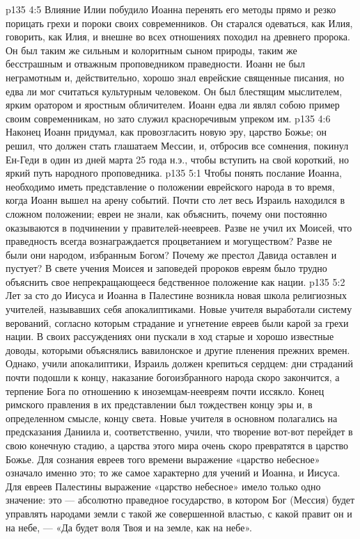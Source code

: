 \vs p135 4:5 Влияние Илии побудило Иоанна перенять его методы прямо и резко порицать грехи и пороки своих современников. Он старался одеваться, как Илия, говорить, как Илия, и внешне во всех отношениях походил на древнего пророка. Он был таким же сильным и колоритным сыном природы, таким же бесстрашным и отважным проповедником праведности. Иоанн не был неграмотным и, действительно, хорошо знал еврейские священные писания, но едва ли мог считаться культурным человеком. Он был блестящим мыслителем, ярким оратором и яростным обличителем. Иоанн едва ли являл собою пример своим современникам, но зато служил красноречивым упреком им.
\vs p135 4:6 Наконец Иоанн придумал, как провозгласить новую эру, царство Божье; он решил, что должен стать глашатаем Мессии, и, отбросив все сомнения, покинул Ен\hyp{}Геди в один из дней марта 25 года н.э., чтобы вступить на свой короткий, но яркий путь народного проповедника.
\vs p135 5:1 Чтобы понять послание Иоанна, необходимо иметь представление о положении еврейского народа в то время, когда Иоанн вышел на арену событий. Почти сто лет весь Израиль находился в сложном положении; евреи не знали, как объяснить, почему они постоянно оказываются в подчинении у правителей\hyp{}неевреев. Разве не учил их Моисей, что праведность всегда вознаграждается процветанием и могуществом? Разве не были они народом, избранным Богом? Почему же престол Давида оставлен и пустует? В свете учения Моисея и заповедей пророков евреям было трудно объяснить свое непрекращающееся бедственное положение как нации.
\vs p135 5:2 Лет за сто до Иисуса и Иоанна в Палестине возникла новая школа религиозных учителей, называвших себя апокалиптиками. Новые учителя выработали систему верований, согласно которым страдание и угнетение евреев были карой за грехи нации. В своих рассуждениях они пускали в ход старые и хорошо известные доводы, которыми объяснялись вавилонское и другие пленения прежних времен. Однако, учили апокалиптики, Израиль должен крепиться сердцем: дни страданий почти подошли к концу, наказание богоизбранного народа скоро закончится, а терпение Бога по отношению к иноземцам\hyp{}неевреям почти иссякло. Конец римского правления в их представлении был тождествен концу эры и, в определенном смысле, концу света. Новые учителя в основном полагались на предсказания Даниила и, соответственно, учили, что творение вот\hyp{}вот перейдет в свою конечную стадию, а царства этого мира очень скоро превратятся в царство Божье. Для сознания евреев того времени выражение «царство небесное» означало именно это; то же самое характерно для учений и Иоанна, и Иисуса. Для евреев Палестины выражение «царство небесное» имело только одно значение: это --- абсолютно праведное государство, в котором Бог (Мессия) будет управлять народами земли с такой же совершенной властью, с какой правит он и на небе, --- «Да будет воля Твоя и на земле, как на небе».
